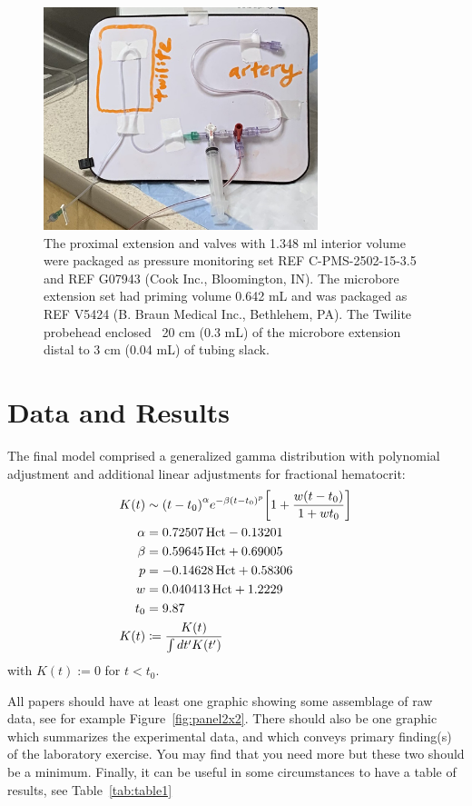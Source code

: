 \begin{figure}[h]
\includegraphics[width=8cm]{photo-schematic.png}
\caption{The proximal extension and valves with 1.348 ml interior volume were packaged as pressure monitoring set REF C-PMS-2502-15-3.5 and REF G07943 (Cook Inc., Bloomington, IN).  The microbore extension set had priming volume 0.642 mL and was packaged as REF V5424 (B. Braun Medical Inc., Bethlehem, PA).  The Twilite probehead enclosed ~20 cm (0.3 mL) of the microbore extension distal to 3 cm (0.04 mL) of tubing slack. \label{fig:photo-schematic}}
\end{figure}

\section{Data and Results}

The final model comprised a generalized gamma distribution with polynomial
adjustment and additional linear adjustments for fractional hematocrit:
%
\begin{align}
	K(t) &\sim \qty(t - t_0)^\alpha e^{-\beta\qty(t - t_0)^p} 
	           \qty[1 + \frac{w \qty(t - t_0)}{1 + w t_0}] \\
	\alpha &= 0.72507 \, \text{Hct} - 0.13201 \\
	\beta &= 0.59645 \, \text{Hct} + 0.69005 \\
    p &= -0.14628 \, \text{Hct} + 0.58306 \\
	w &= 0.040413 \, \text{Hct} + 1.2229 \\
	t_0 & = 9.87 \\
	K(t) &\coloneqq \frac{K(t)}{\int dt' K(t')}
\end{align}
%
with $K(t) := 0$ for $t < t_0$.

All papers should have at least one graphic showing some assemblage of
raw data, see for example Figure~\ref{fig:panel2x2}. There should also
be one graphic which summarizes the experimental data, and which
conveys primary finding(s) of the laboratory exercise.  You may find
that you need more but these two should be a minimum.  Finally, it can
be useful in some circumstances to have a table of results, see
Table~\ref{tab:table1}


